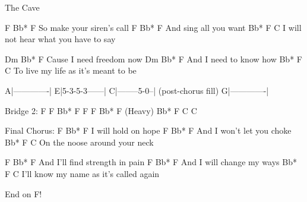 \begin{SBSong}{The Cave}
\begin{SBVerse}
   F         Bb*     F
So make your siren's call
    F    Bb*     F
And sing all you want
  Bb*      F             C
I will not hear what you have to say

      Dm     Bb*     F
Cause I need freedom now
    Dm     Bb*     F
And I need to know how
   Bb*     F            C
To live my life as it's meant to be

A|-------------|
E|5-3-5-3------|
C|--------5-0--|    (post-chorus fill)
G|-------------|

Bridge 2:
F	F	Bb*	F
F	F	Bb*	F	(Heavy)
Bb*	F	C	C
  \end{SBVerse}
  \begin{SBChorus}
Final Chorus:
F      Bb*     F
I will hold on hope
    F       Bb*     F
And I won't let you choke
Bb*    F      C
On the noose around your neck

    F         Bb*         F
And I'll find strength in pain
    F      Bb*       F
And I will change my ways
     Bb*     F            C
I'll know my name as it's called again

End on F!
  \end{SBChorus}
\end{SBSong}